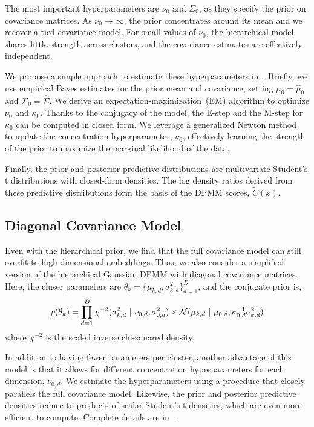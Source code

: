 The most important hyperparameters are $\nu_0$ and $\Sigma_0$, as they specify the prior on covariance matrices.
As $\nu_0 \to \infty$, the prior concentrates around its mean and we recover a tied covariance model. For small values of $\nu_0$, the hierarchical model shares little strength across clusters, and the covariance estimates are effectively independent.

We propose a simple approach to estimate these hyperparameters in~. Briefly, we use empirical Bayes estimates for the prior mean and covariance, setting $\mu_0 = \hat{\mu}_0$ and $\Sigma_0 = \hat{\Sigma}$. We derive an expectation-maximization~(EM) algorithm to optimize $\nu_0$ and $\kappa_0$. Thanks to the conjugacy of the model, the E-step and the M-step for $\kappa_0$ can be computed in closed form. We leverage a generalized Newton method~\citep{minka2000beyond} to update the concentration hyperparameter, $\nu_0$, effectively learning the strength of the prior to maximize the marginal likelihood of the data.

Finally, the prior and posterior predictive distributions are  multivariate Student's t distributions with closed-form densities.
The log density ratios derived from these predictive distributions form the basis of the DPMM scores, $\widetilde{C}(x)$.

\subsection{Diagonal Covariance Model}

Even with the hierarchical prior, we find that the full covariance model can still overfit to high-dimensional embeddings.
Thus, we also consider a simplified version of the hierarchical Gaussian DPMM with diagonal covariance matrices.
Here, the cluser parameters are $\theta_k = \{\mu_{k,d}, \sigma_{k,d}^2\}_{d=1}^D$, and the conjugate prior is,
\begin{equation}
    p(\theta_k) = \prod_{d=1}^D \chi^{-2}(\sigma_{k,d}^2 ~\vert~ \nu_{0,d}, \sigma_{0,d}^2)
    \times \mathcal{N}(\mu_{k,d} ~\vert~ \mu_{0,d}, \kappa_{0,d}^{-1} \sigma_{k,d}^2)
\end{equation}
where $\chi^{-2}$ is the scaled inverse chi-squared density.

In addition to having fewer parameters per cluster, another advantage of this model is that it allows for
different concentration hyperparameters for each dimension, $\nu_{0,d}$. We estimate the hyperparameters using a
procedure that closely parallels the full covariance model. Likewise, the prior
and posterior predictive densities reduce to products of scalar Student's t
densities, which are even more efficient to compute.
Complete details are in~.

